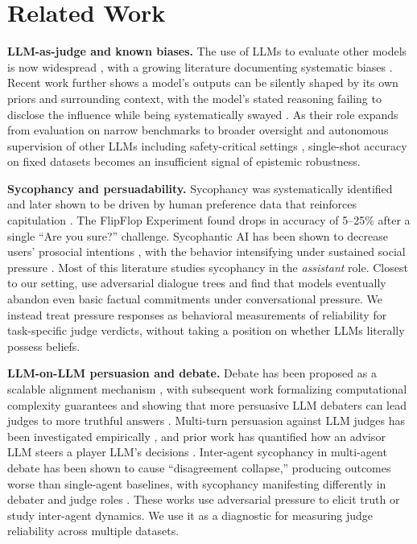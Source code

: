 \section{Related Work}
\label{sec:related_work}

\textbf{LLM-as-judge and known biases.} The use of LLMs to evaluate other models is now widespread 
\citep{zheng2024judging,chiang2024chatbot,li2024llmjudgesurvey}, with a growing literature documenting systematic biases 
\citep{wang2024unfair,wang2025instability,dubois2024length,wataoka2024selfpreference}. Recent work further shows a model's 
outputs can be silently shaped by its own priors and surrounding context, with the model's stated reasoning failing to 
disclose the influence while being systematically swayed \citep{betley2026value}. As their role expands from evaluation on narrow 
benchmarks to broader oversight and autonomous supervision of other LLMs 
\citep{bowman2022measuring,bai2022constitutional,lambert2024rewardbench} including safety-critical settings \citep{llamaguard2023,wildguardmix2024,aegis2024,zeng2024shieldgemma},
single-shot accuracy on fixed datasets becomes an insufficient signal of epistemic robustness.

\textbf{Sycophancy and persuadability.} Sycophancy was systematically identified \citep{perez2022discovering} and later 
shown to be driven by human preference data that reinforces capitulation \citep{sharma2024sycophancy}. 
The FlipFlop Experiment \citep{laban2023flipflop} found drops in accuracy of 5--25\% after a single ``Are you sure?'' challenge.
Sycophantic AI has been shown to decrease users' prosocial intentions \citep{cheng2026sycophantic}, with the behavior
intensifying under sustained social pressure \citep{cheng2026social}. Most of this literature studies sycophancy in the
\emph{assistant} role. Closest to our setting, \citet{sokol2026core} use adversarial dialogue trees and find that models
eventually abandon even basic factual commitments under conversational pressure. We instead treat pressure responses as
behavioral measurements of reliability for task-specific judge verdicts, without taking a position on whether LLMs
literally possess beliefs.

\textbf{LLM-on-LLM persuasion and debate.} Debate has been proposed as a scalable alignment mechanism
\citep{irving2018debate}, with subsequent work formalizing computational complexity guarantees
\citep{browncohen2024debate} and showing that more persuasive LLM debaters can lead judges to more truthful answers
\citep{khan2024debating}. Multi-turn persuasion against LLM judges has been investigated empirically
\citep{xu2023earthflat,agarwal2025persuasion}, and prior work has quantified how an advisor LLM steers a player LLM's
decisions \citep{robinson2026influence}. Inter-agent sycophancy in multi-agent debate has been shown to cause
``disagreement collapse,'' producing outcomes worse than single-agent baselines, 
with sycophancy manifesting differently in debater and judge roles \citep{yao2025peacemaker}. These works use adversarial pressure to 
elicit truth or study inter-agent dynamics. We use it as a diagnostic for measuring judge reliability across multiple datasets.

